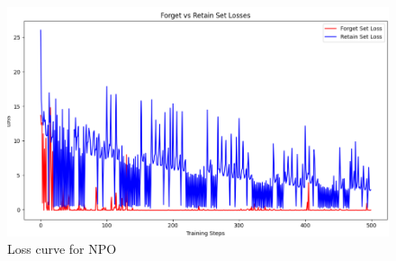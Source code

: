 \documentclass[11pt]{article}
\begin{document}
    \begin{figure}[htbp]
        \centering
        \includegraphics[width=0.9\linewidth]{plot/NPO_train_curve}
        \caption{Loss curve for NPO}
        \label{fig:NPO-loss}
    \end{figure}
\end{document}
